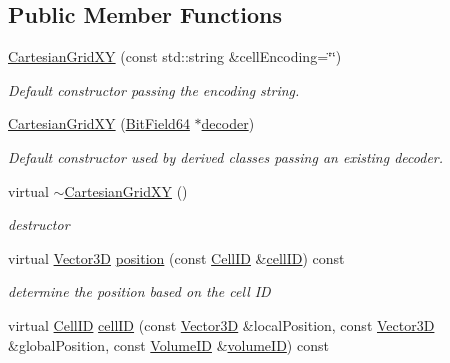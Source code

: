 \subsection*{Public Member Functions}
\begin{DoxyCompactItemize}
\item 
\hyperlink{class_d_d4hep_1_1_d_d_segmentation_1_1_cartesian_grid_x_y_a7fe8b00de8abcee4e8cbfc71b8ee6c32}{Cartesian\+Grid\+XY} (const std\+::string \&cell\+Encoding=\char`\"{}\char`\"{})
\begin{DoxyCompactList}\small\item\em Default constructor passing the encoding string. \end{DoxyCompactList}\item 
\hyperlink{class_d_d4hep_1_1_d_d_segmentation_1_1_cartesian_grid_x_y_a1df3c8a66b3c58d8d93ede3db742a5c6}{Cartesian\+Grid\+XY} (\hyperlink{class_d_d4hep_1_1_d_d_segmentation_1_1_bit_field64}{Bit\+Field64} $\ast$\hyperlink{class_d_d4hep_1_1_d_d_segmentation_1_1_segmentation_abec3489982d0fe91ef4b142d9d755576}{decoder})
\begin{DoxyCompactList}\small\item\em Default constructor used by derived classes passing an existing decoder. \end{DoxyCompactList}\item 
virtual \hyperlink{class_d_d4hep_1_1_d_d_segmentation_1_1_cartesian_grid_x_y_aeaad4807131cbd3536718b66a0a76b0d}{$\sim$\+Cartesian\+Grid\+XY} ()
\begin{DoxyCompactList}\small\item\em destructor \end{DoxyCompactList}\item 
virtual \hyperlink{struct_d_d4hep_1_1_d_d_segmentation_1_1_vector3_d}{Vector3D} \hyperlink{class_d_d4hep_1_1_d_d_segmentation_1_1_cartesian_grid_x_y_a699a4abe55b46d29e5a0d43fcb76b81c}{position} (const \hyperlink{namespace_d_d4hep_1_1_d_d_segmentation_ac7af071d85cb48820914434a07e21ba1}{Cell\+ID} \&\hyperlink{class_d_d4hep_1_1_d_d_segmentation_1_1_cartesian_grid_x_y_a06e75589ebca4af45178854dc341b9c0}{cell\+ID}) const
\begin{DoxyCompactList}\small\item\em determine the position based on the cell ID \end{DoxyCompactList}\item 
virtual \hyperlink{namespace_d_d4hep_1_1_d_d_segmentation_ac7af071d85cb48820914434a07e21ba1}{Cell\+ID} \hyperlink{class_d_d4hep_1_1_d_d_segmentation_1_1_cartesian_grid_x_y_a06e75589ebca4af45178854dc341b9c0}{cell\+ID} (const \hyperlink{struct_d_d4hep_1_1_d_d_segmentation_1_1_vector3_d}{Vector3D} \&local\+Position, const \hyperlink{struct_d_d4hep_1_1_d_d_segmentation_1_1_vector3_d}{Vector3D} \&global\+Position, const \hyperlink{namespace_d_d4hep_1_1_d_d_segmentation_a61a6833a18d1800bdef176595f83e3ba}{Volume\+ID} \&\hyperlink{class_d_d4hep_1_1_d_d_segmentation_1_1_segmentation_a43c0e9648e3b7cded015847c0802f757}{volume\+ID}) const

\end{DoxyCompactItemize}
